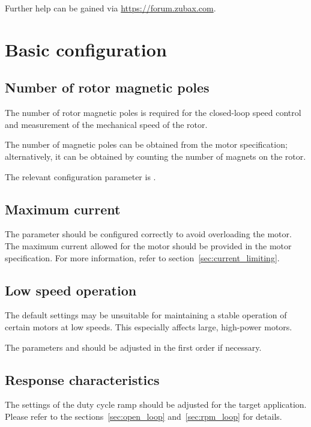 \documentclass{zubaxdoc}
\begin{document}
Further help can be gained via \url{https://forum.zubax.com}.

\section{Basic configuration}

\subsection{Number of rotor magnetic poles}

The number of rotor magnetic poles is required for the closed-loop speed control and
measurement of the mechanical speed of the rotor.

The number of magnetic poles can be obtained from the motor specification;
alternatively, it can be obtained by counting the number of magnets on the rotor.

The relevant configuration parameter is .

\subsection{Maximum current}

The parameter  should be configured correctly to avoid overloading the motor.
The maximum current allowed for the motor should be provided in the motor specification.
For more information, refer to section~\ref{sec:current_limiting}.

\subsection{Low speed operation}

The default settings may be unsuitable for maintaining a stable operation of certain motors at low speeds.
This especially affects large, high-power motors.

The parameters  and  should be adjusted in the first
order if necessary.

\subsection{Response characteristics}

The settings of the duty cycle ramp should be adjusted for the target application.
Please refer to the sections~\ref{sec:open_loop} and~\ref{sec:rpm_loop} for details.
\end{document}
